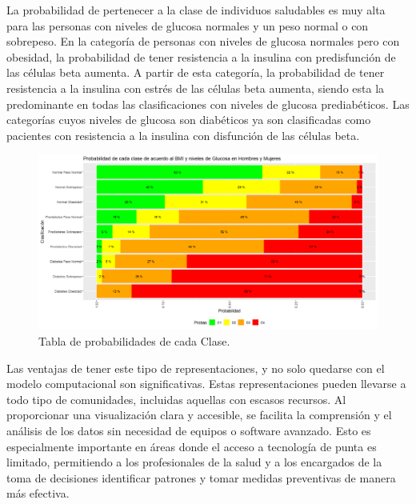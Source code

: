 La probabilidad de pertenecer a la clase de individuos saludables es muy alta para las personas con niveles de glucosa normales y un peso normal o con sobrepeso. En la categoría de personas con niveles de glucosa normales pero con obesidad, la probabilidad de tener resistencia a la insulina con predisfunción de las células beta aumenta. A partir de esta categoría, la probabilidad de tener resistencia a la insulina con estrés de las células beta aumenta, siendo esta la predominante en todas las clasificaciones con niveles de glucosa prediabéticos. Las categorías cuyos niveles de glucosa son diabéticos ya son clasificadas como pacientes con resistencia a la insulina con disfunción de las células beta.


\begin{figure}[H]

    \centering
    \includegraphics[height = 12 cm, width = 0.99 \textwidth]{4img/tablaT.png}
    \caption{Tabla de probabilidades de cada Clase.}
    \label{fig:tabla4varTotal}
\end{figure}



Las ventajas de tener este tipo de representaciones, y no solo quedarse con el modelo computacional son significativas. Estas representaciones pueden llevarse a todo tipo de comunidades, incluidas aquellas con escasos recursos. Al proporcionar una visualización clara y accesible, se facilita la comprensión y el análisis de los datos sin necesidad de equipos o software avanzado. Esto es especialmente importante en áreas donde el acceso a tecnología de punta es limitado, permitiendo a los profesionales de la salud y a los encargados de la toma de decisiones identificar patrones y tomar medidas preventivas de manera más efectiva.

